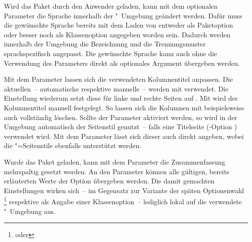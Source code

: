 \begin{DeclareEntity*}{}
\begin{DeclareEntity*}{}
\begin{DeclareEntity*}{}
\begin{Declaration}
\begin{Declaration}
\begin{Declaration}
\begin{Declaration}
\begin{Declaration}
\begin{Declaration}
\begin{Declaration}
Wird das Paket  durch den Anwender geladen, kann mit dem 
optionalen Parameter  die Sprache 
innerhalb der "~Umgebung geändert werden. Dafür muss die 
gewünschte Sprache bereits mit dem Laden von  entweder als 
Paketoption oder besser noch als Klassenoption angegeben worden sein. Dadurch 
werden innerhalb der Umgebung die Bezeichnung  und die 
Trennungsmuster sprachspezifisch angepasst. Die gewünschte Sprache kann auch 
ohne die Verwendung des Parameters  direkt als 
optionales Argument übergeben werden.

%
Mit dem Parameter  lassen sich die verwendeten 
Kolumnentitel anpassen. Die aktuellen~-- automatische respektive manuelle~-- 
werden mit  verwendet. 
Die Einstellung  
wiederum setzt diese für linke und rechte Seiten auf . Mit 
 wird 
der Kolumnentitel manuell festgelegt. So lassen sich die Kolumnen mit 
 beispielsweise auch vollständig 
löschen. Sollte der Parameter  aktiviert werden, 
so wird in der Umgebung automatisch der Seitenstil  
genutzt~-- falls eine Titelseite (\KOMAScript-Option ) 
verwendet wird. Mit dem Parameter  lässt sich 
dieser auch direkt angeben, wobei die "=Seitenstile 
ebenfalls unterstützt werden.

Wurde das Paket  geladen, kann mit dem Parameter 
 die Zusammenfassung mehrspaltig 
gesetzt werden. An den Parameter  können alle 
gültigen, bereits erläuterten Werte der Option  übergeben 
werden. Die damit gemachten Einstellungen wirken sich~-- im Gegensatz 
zur Variante der späten Optionenwahl%
\footnote{%
   oder
}
respektive als Angabe einer Klassenoption~-- lediglich lokal auf die verwendete 
"~Umgebung aus.


\end{Declaration}
\end{Declaration}
\end{Declaration}
\end{Declaration}
\end{Declaration}
\end{Declaration}
\end{Declaration}
\end{DeclareEntity*}
\end{DeclareEntity*}
\end{DeclareEntity*}
